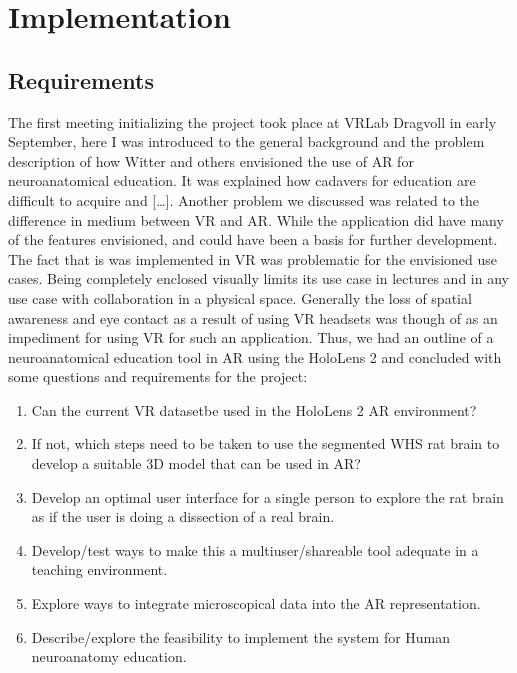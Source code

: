 


\chapter{Implementation}


\section{Requirements}

%
%


The first meeting initializing the project took place at VRLab Dragvoll in early September, here I was introduced to the general background and the problem description of how Witter and others envisioned the use of AR for neuroanatomical education. It was explained how cadavers for education are difficult to acquire and [\dots]. 
Another problem we discussed was related to the difference in medium between VR and AR. While the application  did have many of the features envisioned, and could have been a basis for further development. The fact that is was implemented in VR was problematic for the envisioned use cases. Being completely enclosed visually limits its use case in lectures and in any use case with collaboration in a physical space. Generally the loss of spatial awareness and eye contact as a result of using VR headsets was though of as an impediment for using VR for such an application. 
Thus, we had an outline of a neuroanatomical education tool in AR using the HoloLens 2 and concluded with some questions and requirements for the project:

\begin{enumerate}\label{mennoslist}
    \item Can the current VR dataset\footnotemark be used in the HoloLens 2 AR environment?
    \item If not, which steps need to be taken to use the segmented WHS rat brain to develop a suitable 3D model that can be used in AR?
    \item Develop an optimal user interface for a single person to explore the rat brain as if the user is doing a dissection of a real brain.
    \item Develop/test ways to make this a multiuser/shareable tool adequate in a teaching environment.
    \item Explore ways to integrate microscopical data into the AR representation.
    \item Describe/explore the feasibility to implement the system for Human neuroanatomy education.
\end{enumerate}

